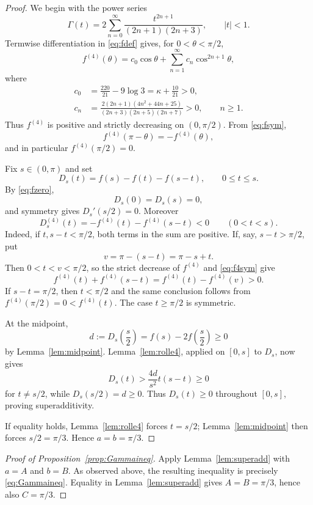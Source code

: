 \documentclass[11pt]{article}
\theoremstyle{definition}
\theoremstyle{remark}
\begin{document}
\begin{proof}
We begin with the power series
\begin{equation}
\label{eq:Gammaseries}
\Gamma(t)
=2\sum_{n=0}^{\infty}
\frac{t^{2n+1}}{(2n+1)(2n+3)},
\qquad |t|<1.
\end{equation}
Termwise differentiation in \eqref{eq:fdef} gives, for $0<\theta<\pi/2$,
\begin{equation}
\label{eq:f4series}
f^{(4)}(\theta)
=c_0\cos\theta
+\sum_{n=1}^{\infty}c_n\cos^{2n+1}\theta,
\end{equation}
where
\begin{align}
\label{eq:coeffs}
c_0&=\frac{220}{21}-9\log3=\kappa+\frac{10}{21}>0,\\
c_n&=\frac{2(2n+1)(4n^2+44n+25)}{(2n+3)(2n+5)(2n+7)}>0,
\qquad n\ge1.
\end{align}
Thus $f^{(4)}$ is positive and strictly decreasing on $(0,\pi/2)$.  From \eqref{eq:fsym},
\begin{equation}
\label{eq:f4sym}
f^{(4)}(\pi-\theta)=-f^{(4)}(\theta),
\end{equation}
and in particular $f^{(4)}(\pi/2)=0$.

Fix $s\in(0,\pi)$ and set
\[
D_s(t)=f(s)-f(t)-f(s-t),
\qquad 0\le t\le s.
\]
By \eqref{eq:fzero},
\[
D_s(0)=D_s(s)=0,
\]
and symmetry gives $D_s'(s/2)=0$.  Moreover
\begin{equation}
\label{eq:D4}
D_s^{(4)}(t)
=-f^{(4)}(t)-f^{(4)}(s-t)<0
\qquad(0<t<s).
\end{equation}
Indeed, if $t,s-t<\pi/2$, both terms in the sum are positive.  If, say, $s-t>\pi/2$, put
\[
v=\pi-(s-t)=\pi-s+t.
\]
Then $0<t<v<\pi/2$, so the strict decrease of $f^{(4)}$ and \eqref{eq:f4sym} give
\[
f^{(4)}(t)+f^{(4)}(s-t)
=f^{(4)}(t)-f^{(4)}(v)>0.
\]
If $s-t=\pi/2$, then $t<\pi/2$ and the same conclusion follows from $f^{(4)}(\pi/2)=0<f^{(4)}(t)$.  The case $t\ge\pi/2$ is symmetric.

At the midpoint,
\[
d:=D_s\left(\frac s2\right)
=f(s)-2f\left(\frac s2\right)\ge0
\]
by Lemma~\ref{lem:midpoint}.  Lemma~\ref{lem:rolle4}, applied on $[0,s]$ to $D_s$, now gives
\[
D_s(t)>\frac{4d}{s^2}t(s-t)\ge0
\]
for $t\ne s/2$, while $D_s(s/2)=d\ge0$.  Thus $D_s(t)\ge0$ throughout $[0,s]$, proving superadditivity.

If equality holds, Lemma~\ref{lem:rolle4} forces $t=s/2$; Lemma~\ref{lem:midpoint} then forces $s/2=\pi/3$.  Hence $a=b=\pi/3$.
\end{proof}

\begin{proof}[Proof of Proposition~\ref{prop:Gammaineq}]
Apply Lemma~\ref{lem:superadd} with $a=A$ and $b=B$.  As observed above, the resulting inequality is precisely \eqref{eq:Gammaineq}.  Equality in Lemma~\ref{lem:superadd} gives $A=B=\pi/3$, hence also $C=\pi/3$.
\end{proof}
\end{document}
